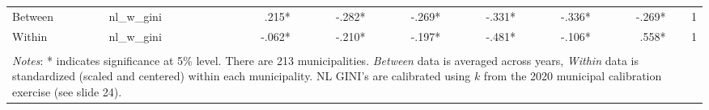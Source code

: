 \documentclass[compress,xcolor=dvipsnames]{beamer}
\begin{document}
\begin{frame}
\begin{table}[ht]
{\begin{tabular}{llrrrrrrr}
  Between & nl\_w\_gini &   .215* &  -.282* &  -.269* &  -.331* &  -.336* &  -.269* &    1    \\ 
  Within & nl\_w\_gini &  -.062* &  -.210* &  -.197* &  -.481* &  -.106* &   .558* &    1    \\  
   \bottomrule \\ [-1em]
   \multicolumn{9}{l}{\parbox{1.25\textwidth}{\footnotesize \textit{Notes}: * indicates significance at 5\% level. There are 213 municipalities. \textit{Between} data is averaged across years, \textit{Within} data is standardized (scaled and centered) within each municipality. NL GINI's are calibrated using $k$ from the 2020 municipal calibration exercise (see slide 24). }}
\end{tabular}
}
\end{table}
\end{frame}
\end{document}
